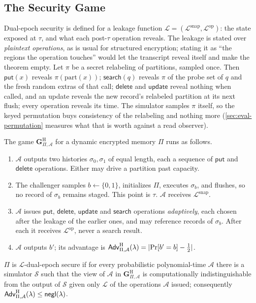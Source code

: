 \subsection{The Security Game}

Dual-epoch security is defined for a leakage function
$\mathcal{L} = (\mathcal{L}^{\mathrm{snap}}, \mathcal{L}^{\mathrm{op}})$: the state exposed at
$\tau$, and what each post-$\tau$ operation reveals. The leakage is stated over \emph{plaintext
operations}, as is usual for structured encryption; stating it as ``the regions the operation
touches'' would let the transcript reveal itself and make the theorem empty. Let $\pi$ be a secret
relabeling of partitions, sampled once. Then $\mathsf{put}(x)$ reveals $\pi(\mathrm{part}(x))$;
$\mathsf{search}(q)$ reveals $\pi$ of the probe set of $q$ and the fresh random extras of that call;
$\mathsf{delete}$ and $\mathsf{update}$ reveal nothing when called, and an update reveals the new
record's relabeled partition at its next flush; every operation reveals its time. The simulator
samples $\pi$ itself, so the keyed permutation buys consistency of the relabeling and nothing more
(\cref{sec:eval-permutation} measures what that is worth against a read observer).

The game $\mathbf{G}^{\mathrm{H}}_{\Pi,\mathcal{A}}$ for a dynamic encrypted memory $\Pi$ runs as
follows.
\begin{enumerate}
\item $\mathcal{A}$ outputs two histories $\sigma_0, \sigma_1$ of equal length, each a sequence of
$\mathsf{put}$ and $\mathsf{delete}$ operations. Either may drive a partition past capacity.
\item The challenger samples $b \leftarrow \{0,1\}$, initializes $\Pi$, executes $\sigma_b$, and
flushes, so no record of $\sigma_b$ remains staged. This point is $\tau$. $\mathcal{A}$ receives
$\mathcal{L}^{\mathrm{snap}}$.
\item $\mathcal{A}$ issues $\mathsf{put}$, $\mathsf{delete}$, $\mathsf{update}$ and $\mathsf{search}$
operations \emph{adaptively}, each chosen after the leakage of the earlier ones, and may reference
records of $\sigma_b$. After each it receives $\mathcal{L}^{\mathrm{op}}$, never a search result.
\item $\mathcal{A}$ outputs $b'$; its advantage is
$\mathsf{Adv}^{\mathrm{H}}_{\Pi,\mathcal{A}}(\lambda) = \lvert \Pr[b'=b] - \tfrac{1}{2}\rvert$.
\end{enumerate}

\begin{definition}
\label{def:dualepoch}
$\Pi$ is $\mathcal{L}$-dual-epoch secure if for every probabilistic polynomial-time $\mathcal{A}$
there is a simulator $\mathcal{S}$ such that the view of $\mathcal{A}$ in
$\mathbf{G}^{\mathrm{H}}_{\Pi,\mathcal{A}}$ is computationally indistinguishable from the output of
$\mathcal{S}$ given only $\mathcal{L}$ of the operations $\mathcal{A}$ issued; consequently
$\mathsf{Adv}^{\mathrm{H}}_{\Pi,\mathcal{A}}(\lambda) \le \mathsf{negl}(\lambda)$.
\end{definition}

